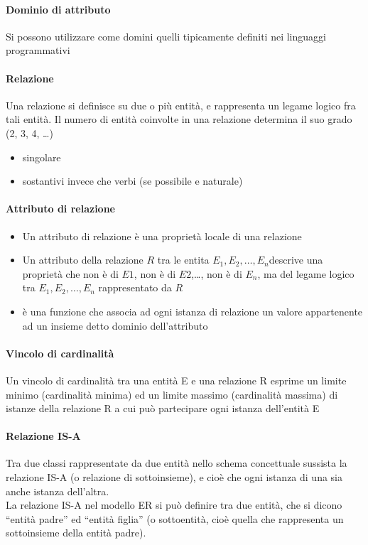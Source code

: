 \documentclass[12pt]{article}
\begin{document}
    \paragraph{Dominio di attributo}
    Si possono utilizzare come domini quelli tipicamente definiti nei linguaggi programmativi
    \paragraph{Relazione}
    Una relazione si definisce su due o più entità, e rappresenta un legame logico fra tali entità. Il numero di entità coinvolte in una relazione determina il suo grado (2, 3, 4, …)
    \begin{itemize}
        \item singolare
        \item sostantivi invece che verbi (se possibile e naturale)
    \end{itemize}
    \paragraph{Attributo di relazione}
    \begin{itemize}
        \item Un attributo di relazione è una proprietà locale di una relazione
        \item Un attributo della relazione $R$ tra le entita $E_1, E_2, \dots,E_n$descrive una proprietà che non è di $E1$, non è di $E2$,…, non è di $E_n$, ma del legame logico tra $E_1, E_2, \dots, E_n$ rappresentato da $R$
        \item è una funzione che associa ad ogni istanza di relazione un valore appartenente ad un insieme detto dominio dell’attributo
    \end{itemize}
    \newpage
    \paragraph{Vincolo di cardinalità}
    Un vincolo di cardinalità tra una entità E e una relazione R esprime un limite minimo (cardinalità minima) ed un limite massimo (cardinalità massima) di istanze della relazione R a cui può partecipare ogni istanza dell’entità E
    \paragraph{Relazione IS-A}
    Tra due classi rappresentate da due entità nello schema concettuale sussista la relazione IS-A (o relazione di sottoinsieme), e cioè che ogni istanza di una sia anche istanza dell’altra.
    \\La relazione IS-A nel modello ER si può definire tra due entità, che si dicono “entità padre” ed “entità figlia” (o sottoentità, cioè quella che rappresenta un sottoinsieme della entità padre).
\end{document}
